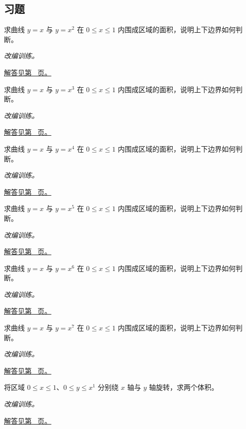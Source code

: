 \documentclass[UTF8,12pt,a4paper,fontset=fandol]{ctexart}
\begin{document}
\subsection{习题}
\begin{example}[两条幂曲线之间的面积]\label{ex:c21q1}
求曲线 $y=x$ 与 $y=x^{2}$ 在 $0\le x\le1$ 内围成区域的面积，说明上下边界如何判断。
\par\textit{改编训练。}\par\hyperref[ans:c21q1]{解答见第~\pageref{ans:c21q1} 页。}
\end{example}
\begin{example}[两条幂曲线之间的面积]\label{ex:c21q2}
求曲线 $y=x$ 与 $y=x^{3}$ 在 $0\le x\le1$ 内围成区域的面积，说明上下边界如何判断。
\par\textit{改编训练。}\par\hyperref[ans:c21q2]{解答见第~\pageref{ans:c21q2} 页。}
\end{example}
\begin{example}[两条幂曲线之间的面积]\label{ex:c21q3}
求曲线 $y=x$ 与 $y=x^{4}$ 在 $0\le x\le1$ 内围成区域的面积，说明上下边界如何判断。
\par\textit{改编训练。}\par\hyperref[ans:c21q3]{解答见第~\pageref{ans:c21q3} 页。}
\end{example}
\begin{example}[两条幂曲线之间的面积]\label{ex:c21q4}
求曲线 $y=x$ 与 $y=x^{5}$ 在 $0\le x\le1$ 内围成区域的面积，说明上下边界如何判断。
\par\textit{改编训练。}\par\hyperref[ans:c21q4]{解答见第~\pageref{ans:c21q4} 页。}
\end{example}
\begin{example}[两条幂曲线之间的面积]\label{ex:c21q5}
求曲线 $y=x$ 与 $y=x^{6}$ 在 $0\le x\le1$ 内围成区域的面积，说明上下边界如何判断。
\par\textit{改编训练。}\par\hyperref[ans:c21q5]{解答见第~\pageref{ans:c21q5} 页。}
\end{example}
\begin{example}[两条幂曲线之间的面积]\label{ex:c21q6}
求曲线 $y=x$ 与 $y=x^{7}$ 在 $0\le x\le1$ 内围成区域的面积，说明上下边界如何判断。
\par\textit{改编训练。}\par\hyperref[ans:c21q6]{解答见第~\pageref{ans:c21q6} 页。}
\end{example}
\begin{example}[同一区域绕不同轴旋转]\label{ex:c21q7}
将区域 $0\le x\le1$、$0\le y\le x^{1}$ 分别绕 $x$ 轴与 $y$ 轴旋转，求两个体积。
\par\textit{改编训练。}\par\hyperref[ans:c21q7]{解答见第~\pageref{ans:c21q7} 页。}
\end{example}
\end{document}
